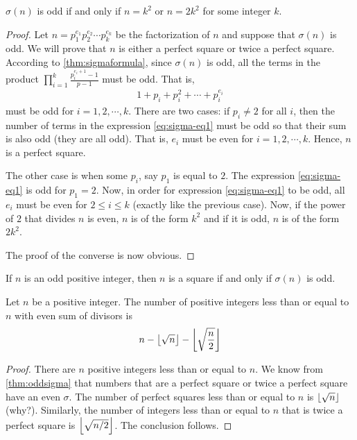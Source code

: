 \begin{theorem}\label{thm:oddsigma}
	$\sigma (n)$ is odd if and only if $n=k^2$ or $n=2k^2$ for some integer $k$.
\end{theorem}

\begin{proof}
	Let $n=p_1^{e_1}p_2^{e_2}\cdots p_k^{e_k}$ be the factorization of $n$ and suppose that $\sigma(n)$ is odd. We will prove that $n$ is either a perfect square or twice a perfect square. According to \autoref{thm:sigmaformula}, since $\sigma(n)$ is odd, all the terms in the product $\prod\limits_{i=1}^{k} \frac{p_i^{e_i+1}-1}{p-1}$ must be odd. That is,
		\begin{align}
			1+p_i+p_i^2+\cdots+p_i^{e_i} \label{eq:sigma-eq1}
		\end{align}
	must be odd for $i=1,2,\cdots,k$. There are two cases: if $p_i\neq 2$ for all $i$, then the number of terms in the expression \ref{eq:sigma-eq1} must be odd so that their sum is also odd (they are all odd). That is, $e_i$ must be even for $i=1,2,\cdots,k$. Hence, $n$ is a perfect square.

	The other case is when some $p_i$, say $p_1$ is equal to $2$. The expression \ref{eq:sigma-eq1} is odd for $p_1=2$. Now, in order for expression \ref{eq:sigma-eq1} to be odd, all $e_i$ must be even for $2 \leq i \leq k$ (exactly like the previous case). Now, if the power of $2$ that divides $n$ is even, $n$ is of the form $k^2$ and if it is odd, $n$ is of the form $2k^2$.

	The proof of the converse is now obvious.
\end{proof}

\begin{corollary}
	If $n$ is an odd positive integer, then $n$ is a square if and only if $\sigma (n)$ is odd.
\end{corollary}

\begin{proposition}
	Let $n$ be a positive integer. The number of positive integers less than or equal to $n$ with even sum of divisors is
	\begin{align*}
		n-\left\lfloor{\sqrt{n}}\right\rfloor-\left\lfloor{\sqrt{\dfrac{n}{2}}}\right\rfloor
	\end{align*}
\end{proposition}

\begin{proof}
	There are $n$ positive integers less than or equal to $n$. We know from \autoref{thm:oddsigma} that numbers that are a perfect square or twice a perfect square have an even $\sigma$. The number of perfect squares less than or equal to $n$ is $\left\lfloor{\sqrt{n}}\right\rfloor$ (why?). Similarly, the number of integers less than or equal to $n$ that is twice a perfect square is $\left\lfloor{\sqrt{n/2}}\right\rfloor$. The conclusion follows.
\end{proof}

